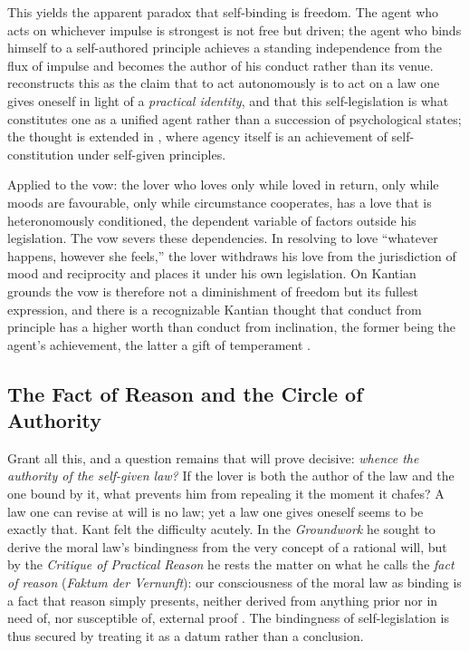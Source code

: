 \documentclass[11pt,a4paper]{article}
\begin{document}
This yields the apparent paradox that self-binding is freedom. The agent who acts on whichever impulse is strongest is not free but driven; the agent who binds himself to a self-authored principle achieves a standing independence from the flux of impulse and becomes the author of his conduct rather than its venue. \textcite{korsgaard1996sources} reconstructs this as the claim that to act autonomously is to act on a law one gives oneself in light of a \emph{practical identity}, and that this self-legislation is what constitutes one as a unified agent rather than a succession of psychological states; the thought is extended in \textcite{korsgaard2009self}, where agency itself is an achievement of self-constitution under self-given principles.

Applied to the vow: the lover who loves only while loved in return, only while moods are favourable, only while circumstance cooperates, has a love that is heteronomously conditioned, the dependent variable of factors outside his legislation. The vow severs these dependencies. In resolving to love ``whatever happens, however she feels,'' the lover withdraws his love from the jurisdiction of mood and reciprocity and places it under his own legislation. On Kantian grounds the vow is therefore not a diminishment of freedom but its fullest expression, and there is a recognizable Kantian thought that conduct from principle has a higher worth than conduct from inclination, the former being the agent's achievement, the latter a gift of temperament \parencite[4:398--399]{kant1785groundwork}.

\subsection{The Fact of Reason and the Circle of Authority}

Grant all this, and a question remains that will prove decisive: \emph{whence the authority of the self-given law?} If the lover is both the author of the law and the one bound by it, what prevents him from repealing it the moment it chafes? A law one can revise at will is no law; yet a law one gives oneself seems to be exactly that. Kant felt the difficulty acutely. In the \emph{Groundwork} he sought to derive the moral law's bindingness from the very concept of a rational will, but by the \emph{Critique of Practical Reason} he rests the matter on what he calls the \emph{fact of reason} (\emph{Faktum der Vernunft}): our consciousness of the moral law as binding is a fact that reason simply presents, neither derived from anything prior nor in need of, nor susceptible of, external proof \parencite[5:31]{kant1788practical}. The bindingness of self-legislation is thus secured by treating it as a datum rather than a conclusion.
\end{document}
